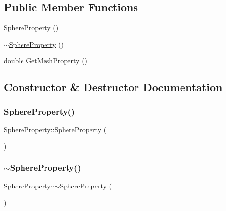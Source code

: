 \subsection*{Public Member Functions}
\begin{DoxyCompactItemize}
\item 
\mbox{\hyperlink{class_sphere_property_afbaa593b5ba4136aa62d7952cebbb1a7}{Sphere\+Property}} ()
\item 
\mbox{\hyperlink{class_sphere_property_af0d76f6d0a868762fbb91b0d23ec99bf}{$\sim$\+Sphere\+Property}} ()
\item 
double \mbox{\hyperlink{class_sphere_property_a61d802642205f2709812de5585705b10}{Get\+Mesh\+Property}} ()
\end{DoxyCompactItemize}


\subsection{Constructor \& Destructor Documentation}
\mbox{\label{class_sphere_property_afbaa593b5ba4136aa62d7952cebbb1a7}} 
\subsubsection{\texorpdfstring{SphereProperty()}{SphereProperty()}}
{\footnotesize\ttfamily Sphere\+Property\+::\+Sphere\+Property (\begin{DoxyParamCaption}{ }\end{DoxyParamCaption})}

\mbox{\label{class_sphere_property_af0d76f6d0a868762fbb91b0d23ec99bf}} 
\subsubsection{\texorpdfstring{$\sim$SphereProperty()}{~SphereProperty()}}
{\footnotesize\ttfamily Sphere\+Property\+::$\sim$\+Sphere\+Property (\begin{DoxyParamCaption}{ }\end{DoxyParamCaption})}



